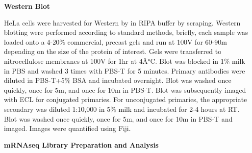 \documentclass[12pt,oneside]{reedthesis}
\begin{document}
\textbf{Western Blot}

HeLa cells were harvested for Western by in RIPA buffer by scraping.
Western blotting were performed according to standard methods, briefly,
each sample was loaded onto a 4-20\% commercial, precast gels and run at
100V for 60-90m depending on the size of the protein of interest. Gels
were transferred to nitrocellulose membranes at 100V for 1hr at 4Â°C.
Blot was blocked in 1\% milk in PBS and washed 3 times with PBS-T for 5
minutes. Primary antibodies were diluted in PBS-T+5\% BSA and incubated
overnight. Blot was washed once quickly, once for 5m, and once for 10m
in PBS-T. Blot was subsequently imaged with ECL for conjugated
primaries. For unconjugated primaries, the appropriate secondary was
diluted 1:10,000 in 5\% milk and incubated for 2-4 hours at RT. Blot was
washed once quickly, once for 5m, and once for 10m in PBS-T and imaged.
Images were quantified using Fiji.

\textbf{mRNAseq Library Preparation and Analysis}
\end{document}
